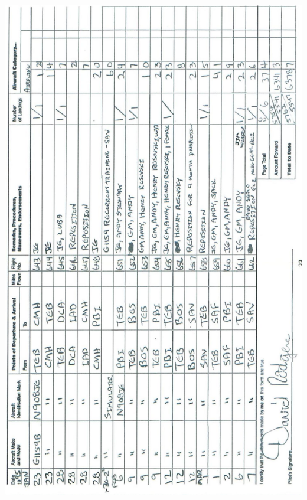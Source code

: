\documentclass[10pt]{article}
\begin{document}
\includegraphics[max width=\textwidth, center]{2025_02_27_dd68c3d38de88f0516d9g-037}
\end{document}

